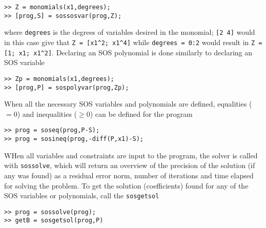 \hspace*{1cm} \texttt{>> Z = monomials(x1,degrees);}\\
\hspace*{1cm} \texttt{>> [prog,S] = sossosvar(prog,Z);}

where \texttt{degrees} is the degrees of variables desired in the monomial; \texttt{[2 4]} would in this case give that \verb|Z = [x1^2; x1^4]| while \texttt{degrees = 0:2} would result in \verb|Z = [1; x1; x1^2]|. Declaring an SOS polynomial is done similarly to declaring an SOS variable

\hspace*{1cm} \texttt{>> Zp = monomials(x1,degrees);}\\
\hspace*{1cm} \texttt{>> [prog,P] = sospolyvar(prog,Zp);}

When all the necessary SOS variables and polynomials are defined, equalities ($=0$) and inequalities ($\geq 0$) can be defined for the program

\hspace*{1cm} \texttt{>> prog = soseq(prog,P-S);}\\
\hspace*{1cm} \texttt{>> prog = sosineq(prog,-diff(P,x1)-S);}

WHen all variables and constraints are input to the program, the solver is called with \texttt{sossolve}, which will return an overview of the precision of the solution (if any was found) as a residual error norm, number of iterations and time elapsed for solving the problem. To get the solution (coefficients) found for any of the SOS variables or polynomials, call the \texttt{sosgetsol}

\hspace*{1cm} \texttt{>> prog = sossolve(prog);}\\
\hspace*{1cm} \texttt{>> getB = sosgetsol(prog,P)}


